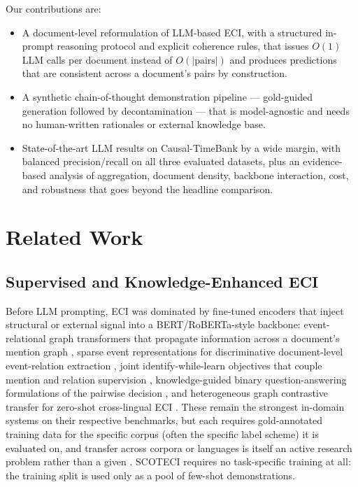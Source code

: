 \documentclass[11pt]{article}
\newcommand{\method}{SCOTECI}
\begin{document}
Our contributions are:
\begin{itemize}
  \item A document-level reformulation of LLM-based ECI, with a structured in-prompt
        reasoning protocol and explicit coherence rules, that issues $O(1)$ LLM
        calls per document instead of $O(|\text{pairs}|)$ and produces predictions
        that are consistent across a document's pairs by construction.
  \item A synthetic chain-of-thought demonstration pipeline --- gold-guided
        generation followed by decontamination --- that is model-agnostic and needs
        no human-written rationales or external knowledge base.
  \item State-of-the-art LLM results on Causal-TimeBank by a wide margin, with
        balanced precision/recall on all three evaluated datasets, plus an
        evidence-based analysis of aggregation, document density, backbone
        interaction, cost, and robustness that goes beyond the headline comparison.
\end{itemize}

\section{Related Work}
\label{sec:related}


\subsection{Supervised and Knowledge-Enhanced ECI}
Before LLM prompting, ECI was dominated by fine-tuned encoders that inject
structural or external signal into a BERT/RoBERTa-style backbone: event-relational
graph transformers that propagate information across a document's mention graph
\citep{chen2022ergo}, sparse event representations for discriminative document-level
event-relation extraction \citep{yuan2023sendir}, joint identify-while-learn
objectives that couple mention and relation supervision \citep{liu2024ilif},
knowledge-guided binary question-answering formulations of the pairwise decision
\citep{wang2024knowqa}, and heterogeneous graph contrastive transfer for zero-shot
cross-lingual ECI \citep{he2024gimc}. These remain the strongest in-domain systems on
their respective benchmarks, but each requires gold-annotated training data for the
specific corpus (often the specific label scheme) it is evaluated on, and transfer
across corpora or languages is itself an active research problem rather than a given
\citep{he2024gimc}. \method{} requires no task-specific training at all: the
training split is used only as a pool of few-shot demonstrations.
\end{document}
